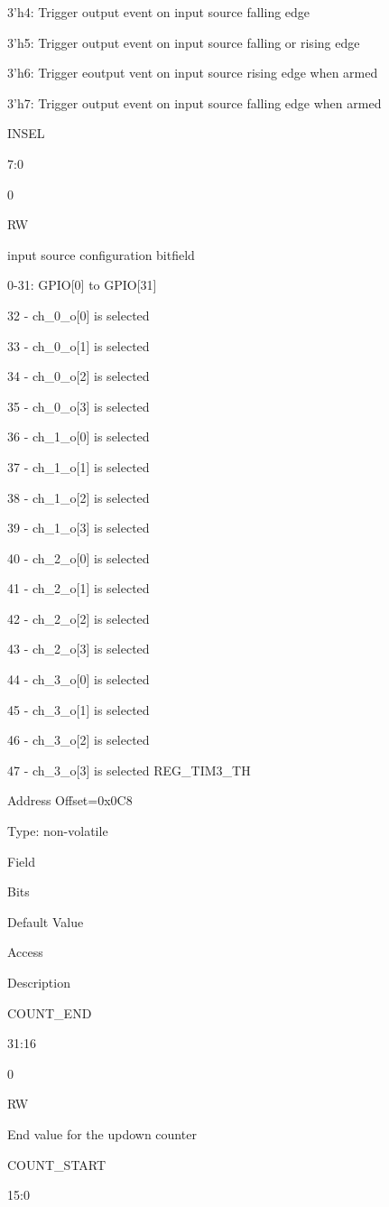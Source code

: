 3’h4: Trigger output event on input source falling edge

3’h5: Trigger output event on input source falling or rising edge

3’h6: Trigger eoutput vent on input source rising edge when armed

3’h7: Trigger output event on input source falling edge when armed

INSEL
	

7:0
	

0
	

RW
	

input source configuration bitfield

0-31: GPIO[0] to GPIO[31]

32 - ch_0_o[0] is selected

33 - ch_0_o[1] is selected

34 - ch_0_o[2] is selected

35 - ch_0_o[3] is selected

36 - ch_1_o[0] is selected

37 - ch_1_o[1] is selected

38 - ch_1_o[2] is selected

39 - ch_1_o[3] is selected

40 - ch_2_o[0] is selected

41 - ch_2_o[1] is selected

42 - ch_2_o[2] is selected

43 - ch_2_o[3] is selected

44 - ch_3_o[0] is selected

45 - ch_3_o[1] is selected

46 - ch_3_o[2] is selected

47 - ch_3_o[3] is selected
REG_TIM3_TH

    Address Offset=0x0C8

    Type: non-volatile

Field
	

Bits
	

Default Value
	

Access
	

Description

COUNT_END
	

31:16
	

0
	

RW
	

End value for the updown counter

COUNT_START
	

15:0
	

